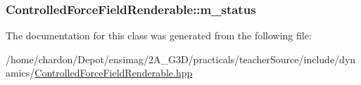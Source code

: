 \hypertarget{classControlledForceFieldRenderable_aeb5e06ce7914d6050578f9466d3c67ad}{
\subsubsection[{m\+\_\+status}]{ Controlled\+Force\+Field\+Renderable\+::m\+\_\+status\hspace{0.3cm}{\ttfamily [private]}}}\label{classControlledForceFieldRenderable_aeb5e06ce7914d6050578f9466d3c67ad}


The documentation for this class was generated from the following file\+:\begin{DoxyCompactItemize}
\item 
/home/chardon/\+Depot/ensimag/2\+A\+\_\+\+G3\+D/practicals/teacher\+Source/include/dynamics/\hyperlink{ControlledForceFieldRenderable_8hpp}{Controlled\+Force\+Field\+Renderable.\+hpp}\end{DoxyCompactItemize}
